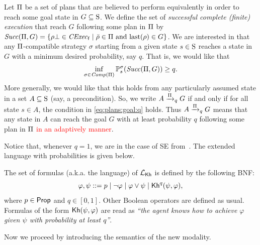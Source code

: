 Let $\plans$ be a set of plans that are believed to perform
equivalently in order to reach some goal state in $G\subseteq\S$.  We
define the set of \emph{successful complete (finite) execution} that
reach $G$ following some plan in $\plans$ by
$\Succ(\plans,G)=\{{\rho\complete\in\cexecf}\mid{\bar{\rho}\in\plans
  \text{ and } \last(\rho)\in G}\}$.
%
We are interested in that any $\plans$-compatible strategy $\sigma$
starting from a given state $s\in\S$ reaches a state in $G$ with a
minimum desired probability, say $q$.  That is, we would like that
%
\begin{equation}\label{eq:plans:goal:q}
  \inf_{\sigma \in\Comp(\plans)}\Prob^\strat_s(\Succ(\plans,G)) \geq q.
\end{equation}
%
More generally, we would like that this holds from any particularly
assumed state in a set $A\subseteq\S$ (say, a precondition).  So, we
write $A \reach{\plans}_q G$ if and only if for all state $s\in A$,
the condition in \cref{eq:plans:goal:q} holds.
%
Thus $A \reach{\plans}_q G$ means that any state in $A$ can reach the
goal $G$ with at least probability $q$ following some plan in $\plans$
\textcolor{red}{in an adaptively manner}.









Notice that, whenever $q=1$, we are in the case of SE from~.  The extended language with probabilities is given below.


\begin{definition}
    \label{def:syntax-extended}
    The set of formulas (a.k.a. the language) of $\Khlogic$ is defined by the following BNF:
    \[
        \varphi, \psi ::= p \mid \neg \varphi \mid \varphi \vee \psi \mid \kh^q(\psi,\varphi),
    \]
    where $p\in\Prop$ and $q\in[0,1]$. Other Boolean operators are defined as usual. Formulas of the form $\kh(\psi,\varphi)$ are read as \emph{``the agent knows how to achieve $\varphi$ given $\psi$ with probability at least $q$''}.
\end{definition}




Now we proceed by introducing the semantics of the new modality.

